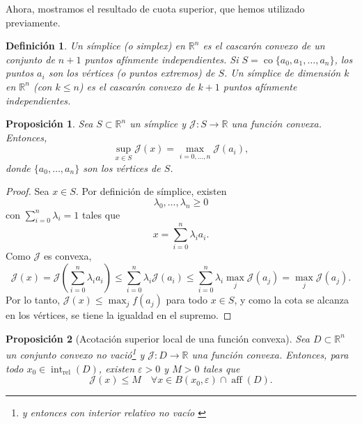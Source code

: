 \documentclass[12pt]{book}
\newtheorem{proposition}{Proposición}
\newtheorem{definition}{Definición}
\theoremstyle{definition}
\theoremstyle{plain}
\theoremstyle{remark}
\begin{document}
Ahora, mostramos el resultado de cuota superior, que hemos utilizado previamente.

\begin{definition}
Un {símplice} (o \textit{simplex}) en $\mathbb{R}^n$ es el {cascarón convexo} de un conjunto de $n+1$ puntos {afínmente independientes}. Si $S = \operatorname{co}\{a_0, a_1, \dots, a_n\}$, los puntos $a_i$ son los {vértices} (o puntos extremos) de $S$.
Un símplice de dimensión $k$ en $\mathbb{R}^n$ (con $k \leq n$) es el cascarón convexo de $k+1$ puntos afínmente independientes.
\end{definition}



\begin{proposition}
    Sea $S \subset \mathbb{R}^n$ un símplice y $\mathcal{J}: S \to \mathbb{R}$ una función {convexa}. Entonces,
\[
\sup_{x \in S} \mathcal{J}(x) = \max_{i=0,\dots,n} \mathcal{J}(a_i),
\]
donde $\{a_0, \dots, a_n\}$ son los vértices de $S$.
\end{proposition}
\begin{proof}
Sea $x \in S$. Por definición de símplice, existen \[\lambda_0, \dots, \lambda_n \geq 0\] con $\sum_{i=0}^n \lambda_i = 1$ tales que
\[
x = \sum_{i=0}^n \lambda_i a_i.
\]
Como $\mathcal{J}$ es convexa,
\[
\mathcal{J}(x) = \mathcal{J}\left(\sum_{i=0}^n \lambda_i a_i\right) \leq \sum_{i=0}^n \lambda_i \mathcal{J}(a_i) \leq \sum_{i=0}^n \lambda_i \max_{j} \mathcal{J}(a_j) = \max_{j} \mathcal{J}(a_j).
\]
Por lo tanto, $\mathcal{J}(x) \leq \max_{j} f(a_j)$ para todo $x \in S$, y como la cota se alcanza en los vértices, se tiene la igualdad en el supremo.
\end{proof}

\begin{proposition}[Acotación superior local de una función convexa]
\label{prop:asup}
Sea $D \subset \mathbb{R}^n$ un conjunto {convexo no vació\footnote{y entonces con interior relativo no vacío \cite{hiriart2001}}} y $\mathcal{J}: D \to \mathbb{R}$ una función {convexa}. Entonces, para todo $x_0 \in \operatorname{int}_{\operatorname{rel}}(D)$, existen $\varepsilon > 0$ y $M > 0$ tales que
\[
\mathcal{J}(x) \leq M \quad \forall x \in B(x_0, \varepsilon) \cap \operatorname{aff}(D).
\]
\end{proposition}
\end{document}
